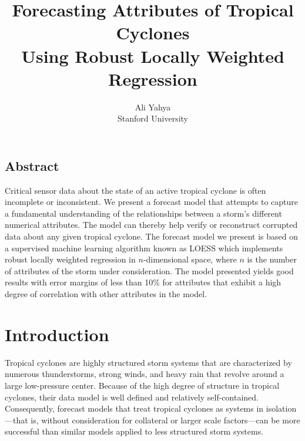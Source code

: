 \documentclass[letterpaper,twocolumn,10pt]{article}
\begin{document}
\date{}

\title{
  \Large \bf Forecasting Attributes of Tropical Cyclones\\
             Using Robust Locally Weighted Regression
}

\author {
  {\rm Ali Yahya}\\
  Stanford University
} %

\maketitle



\subsection*{Abstract}
Critical sensor data about the state of an active tropical cyclone is often
incomplete or inconsistent. We present a forecast model that attempts to capture
a fundamental understanding of the relationships between a storm's different
numerical attributes. The model can thereby help verify or reconstruct corrupted
data about any given tropical cyclone. The forecast model we present is based on
a supervised machine learning algorithm known as LOESS which implements robust
locally weighted regression in $n$-dimensional space, where $n$ is the number
of attributes of the storm under consideration. The model presented yields good
results with error margins of less than 10\% for attributes that exhibit a high
degree of correlation with other attributes in the model.



\section{Introduction}

Tropical cyclones are highly structured storm systems that are characterized by
numerous thunderstorms, strong winds, and heavy rain that revolve around a large
low-pressure center. Because of the high degree of structure in tropical
cyclones, their data model is well defined and relatively self-contained.
Consequently, forecast models that treat tropical cyclones as systems in
isolation---that is, without consideration for collateral or larger scale
factors---can be more successful than similar models applied to less structured
storm systems.
\end{document}
